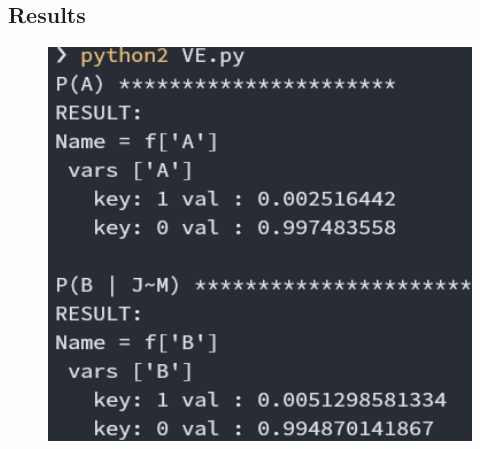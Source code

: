\documentclass[a4paper, 11pt]{article}
\begin{document}
\subsection{Results}
\begin{figure}[h]
  \centering
  \includegraphics[width=14cm]{result.png}
\end{figure}



%
%
\end{document}
